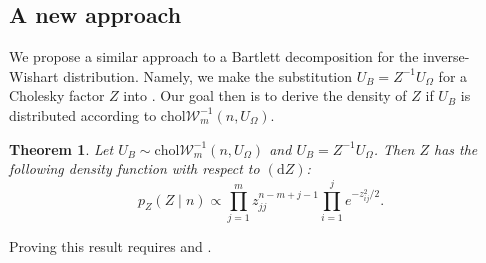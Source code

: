 \documentclass[12pt,a4paper,reqno]{amsart}
\numberwithin{equation}{section}
\newtheorem{theorem}{Theorem}[section]
\newcommand{\cholinvwishart}[1]{\mathrm{chol}\mathcal{W}^{-1}_{#1}}
\newcommand{\dmeasure}[1]{\left(\dd{#1}\right)}
\newcommand{\dd}[1]{\mathrm{d}{#1}}
\begin{document}
\subsection{A new approach}

We propose a similar approach to a Bartlett decomposition for the inverse-Wishart distribution.
Namely, we make the substitution $U_B = Z^{-1} U_\Omega$ for a Cholesky factor $Z$ into .
Our goal then is to derive the density of $Z$ if $U_B$ is distributed according to $\cholinvwishart{m}(n, U_\Omega)$.
\begin{theorem}\label{thm:invwishartbartlettdensity}
    Let $U_B \sim \cholinvwishart{m}(n, U_\Omega)$ and $U_B = Z^{-1} U_\Omega$.
    Then $Z$ has the following density function with respect to $\dmeasure{Z}$:
    \begin{equation}\label{invwishartbartlett}
        p_Z(Z \mid n) \propto \prod_{j=1}^m z_{jj}^{n-m+j-1} \prod_{i=1}^j e^{-z_{ij}^2/2}.
    \end{equation}
\end{theorem}

Proving this result requires  and .
\end{document}
